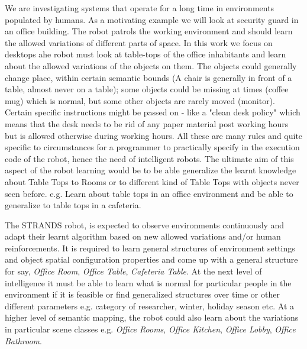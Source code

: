 \documentclass[letterpaper, 10 pt, conference]{ieeeconf}  %
\begin{document}
We are investigating systems that operate for a long time in environments populated by humans. As a motivating example we will look at 
security guard in an office building. The robot patrols the working environment and should learn the allowed variations of different parts of space. In this work we focus on desktops ahe robot must look at table-tops of the office inhabitants and learn 
about the allowed variations of the objects on them. The objects could generally change place, within certain semantic bounds (A chair is 
generally in front of a table, almost never on a table); some objects could be missing at times (coffee mug) which is normal, but some other 
objects are rarely moved (monitor). Certain specific instructions might be passed on - like a "clean desk policy" which means that the desk 
needs to be rid of any paper material post working hours but is allowed otherwise during working hours. All these are many rules and quite 
specific to circumstances for a programmer to practically specify in the execution code of the robot, hence the need of intelligent robots. 
The ultimate aim of this aspect of the robot learning would be to be able generalize the learnt knowledge about Table Tops to Rooms or to 
different kind of Table Tops with objects never seen before. e.g. Learn about table tops in an office environment and be able to generalize 
to table tops in a cafeteria.

The STRANDS robot, is expected to observe environments continuously and adapt their learnt algorithm based on new allowed variations and/or human reinforcements. It is required to learn general structures of environment settings and object spatial configuration properties and come up with a general structure for say, \textit{Office Room}, \textit{Office Table}, \textit{Cafeteria Table}. At the next level of intelligence it must be able to learn what is normal for particular people in the environment if it is feasible or find generalized structures over time or other different parameters e.g. category of researcher, winter, holiday season etc. At a higher level of semantic mapping, the robot could also learn about the variations in particular scene classes e.g. \textit{Office Rooms}, \textit{Office Kitchen}, \textit{Office Lobby}, \textit{Office Bathroom}.
\end{document}

